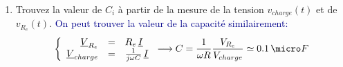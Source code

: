 {\begin{enumerate}
\begin{table}[h!]
{\begin{tabular}{|c|c|c|c|c|c|}
        \hline
        \end{tabular}}
        \caption{Valeurs de déphasage pour différentes fréquences.}
        \label{tab:my_label}
    \end{table}
    \FloatBarrier
    \textcolor{darkblue}{Le déphasage devrait valoir -45° à la fréquence de coupure.}
    \item Trouvez la valeur de $C_i$ à partir de la mesure de la tension $v_{charge}(t)$ et de $v_{R_e}(t)$.
    \textcolor{darkblue}{On peut trouver la valeur de la capacité similairement:
    $$
     \left\{
                \begin{array}{r c l}
                  \underline{V}_{R_e} & = & R_e\,\underline{I}\\
                  \underline{V}_{charge} & = &\frac{1}{j\omega C}\,\underline{I}\\
                \end{array}
              \right. \longrightarrow  C=\frac{1}{\omega R}\frac{V_{R_e}}{V_{charge}}\simeq0.1 \,\micro F$$
    }
\end{enumerate}}{}

